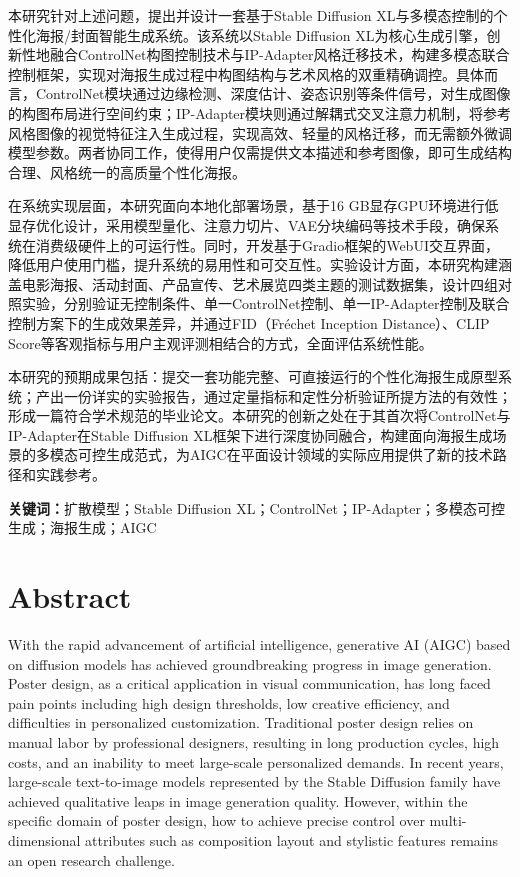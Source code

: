 \documentclass[12pt,a4paper]{ctexart}
\newcommand{\sdxl}{Stable Diffusion XL}
\newcommand{\controlnet}{ControlNet}
\newcommand{\ipadapter}{IP-Adapter}
\begin{document}
本研究针对上述问题，提出并设计一套基于\sdxl{}与多模态控制的个性化海报/封面智能生成系统。该系统以\sdxl{}为核心生成引擎，创新性地融合\controlnet{}构图控制技术与\ipadapter{}风格迁移技术，构建多模态联合控制框架，实现对海报生成过程中构图结构与艺术风格的双重精确调控。具体而言，\controlnet{}模块通过边缘检测、深度估计、姿态识别等条件信号，对生成图像的构图布局进行空间约束；\ipadapter{}模块则通过解耦式交叉注意力机制，将参考风格图像的视觉特征注入生成过程，实现高效、轻量的风格迁移，而无需额外微调模型参数。两者协同工作，使得用户仅需提供文本描述和参考图像，即可生成结构合理、风格统一的高质量个性化海报。

在系统实现层面，本研究面向本地化部署场景，基于16 GB显存GPU环境进行低显存优化设计，采用模型量化、注意力切片、VAE分块编码等技术手段，确保系统在消费级硬件上的可运行性。同时，开发基于Gradio框架的WebUI交互界面，降低用户使用门槛，提升系统的易用性和可交互性。实验设计方面，本研究构建涵盖电影海报、活动封面、产品宣传、艺术展览四类主题的测试数据集，设计四组对照实验，分别验证无控制条件、单一\controlnet{}控制、单一\ipadapter{}控制及联合控制方案下的生成效果差异，并通过FID（Fréchet Inception Distance）、CLIP Score等客观指标与用户主观评测相结合的方式，全面评估系统性能。

本研究的预期成果包括：提交一套功能完整、可直接运行的个性化海报生成原型系统；产出一份详实的实验报告，通过定量指标和定性分析验证所提方法的有效性；形成一篇符合学术规范的毕业论文。本研究的创新之处在于其首次将\controlnet{}与\ipadapter{}在\sdxl{}框架下进行深度协同融合，构建面向海报生成场景的多模态可控生成范式，为AIGC在平面设计领域的实际应用提供了新的技术路径和实践参考。

\vspace{1em}
\noindent \textbf{关键词：}扩散模型；Stable Diffusion XL；ControlNet；IP-Adapter；多模态可控生成；海报生成；AIGC

\newpage
\section*{\centering \Large Abstract}

\vspace{1em}

With the rapid advancement of artificial intelligence, generative AI (AIGC) based on diffusion models has achieved groundbreaking progress in image generation. Poster design, as a critical application in visual communication, has long faced pain points including high design thresholds, low creative efficiency, and difficulties in personalized customization. Traditional poster design relies on manual labor by professional designers, resulting in long production cycles, high costs, and an inability to meet large-scale personalized demands. In recent years, large-scale text-to-image models represented by the Stable Diffusion family have achieved qualitative leaps in image generation quality. However, within the specific domain of poster design, how to achieve precise control over multi-dimensional attributes such as composition layout and stylistic features remains an open research challenge.
\end{document}
